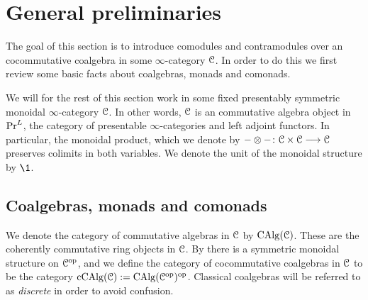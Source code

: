 
\section{General preliminaries}

The goal of this section is to introduce comodules and contramodules over an cocommutative coalgebra in some $\infty$-category $\EuScript{C}$. In order to do this we first review some basic facts about coalgebras, monads and comonads. 

We will for the rest of this section work in some fixed presentably symmetric monoidal $\infty$-category $\EuScript{C}$. In other words, $\EuScript{C}$ is an commutative algebra object in $\mathrm{Pr}^L$, the category of presentable $\infty$-categories and left adjoint functors. In particular, the monoidal product, which we denote by $-\otimes-\colon\EuScript{C}\times \EuScript{C}\longrightarrow\EuScript{C}$ preserves colimits in both variables. We denote the unit of the monoidal structure by $\1$. 


\subsection{Coalgebras, monads and comonads}

We denote the category of commutative algebras in $\EuScript{C}$ by $\operatorname{CAlg}(\EuScript{C})$. These are the coherently commutative ring objects in $\EuScript{C}$. By \cite[2.4.2.7]{Lurie_HA} there is a symmetric monoidal structure on $\EuScript{C}^{\mathrm{op}}$, and we define the category of cocommutative coalgebras in $\EuScript{C}$ to be the category $\operatorname{cCAlg}(\EuScript{C}):= \operatorname{CAlg}(\EuScript{C}^{\mathrm{op}})^{\mathrm{op}}$. Classical coalgebras will be referred to as \emph{discrete} in order to avoid confusion. 

